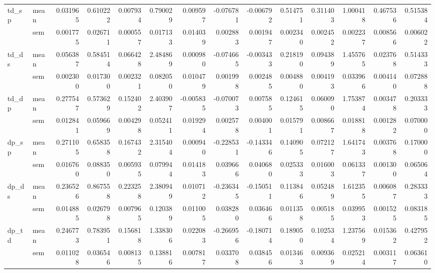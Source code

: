 \begin{tabular}{llrrrrrrrrrrrr}
\cline{1-14}
\multirow[t]{2}{*}{td_sp} & mean & 0.031965 & 0.610222 & 0.007934 & 0.790029 & 0.009597 & -0.076781 & -0.006792 & 0.514751 & 0.311403 & 1.000418 & 0.467536 & 0.515384 \\
 & sem & 0.001775 & 0.026711 & 0.000557 & 0.017133 & 0.014039 & 0.002883 & 0.001947 & 0.002340 & 0.002452 & 0.002237 & 0.008566 & 0.006022 \\
\cline{1-14}
\multirow[t]{2}{*}{td_ds} & mean & 0.056387 & 0.584514 & 0.066428 & 2.484869 & 0.000980 & -0.074665 & -0.003433 & 0.218190 & 0.094389 & 1.455765 & 0.023768 & 0.514333 \\
 & sem & 0.002300 & 0.017300 & 0.002321 & 0.082050 & 0.010479 & 0.001998 & 0.002485 & 0.004880 & 0.004193 & 0.033966 & 0.004140 & 0.072888 \\
\cline{1-14}
\multirow[t]{2}{*}{td_dp} & mean & 0.277547 & 0.573629 & 0.152402 & 2.403907 & -0.005835 & -0.070073 & 0.007585 & 0.124615 & 0.060090 & 1.753874 & 0.003478 & 0.203333 \\
 & sem & 0.012841 & 0.059669 & 0.004298 & 0.052411 & 0.019294 & 0.002578 & 0.004001 & 0.015791 & 0.008667 & 0.018818 & 0.001282 & 0.070000 \\
\cline{1-14}
\multirow[t]{2}{*}{dp_sp} & mean & 0.271105 & 0.658358 & 0.167432 & 2.315404 & 0.000940 & -0.228531 & -0.143346 & 0.140905 & 0.072127 & 1.641743 & 0.003768 & 0.170000 \\
 & sem & 0.016760 & 0.088350 & 0.005935 & 0.079944 & 0.014183 & 0.039666 & 0.040680 & 0.025333 & 0.016003 & 0.061337 & 0.001300 & 0.065064 \\
\cline{1-14}
\multirow[t]{2}{*}{dp_ds} & mean & 0.236526 & 0.867558 & 0.223258 & 2.380949 & 0.010712 & -0.236345 & -0.150511 & 0.113846 & 0.052489 & 1.612355 & 0.006087 & 0.283333 \\
 & sem & 0.014885 & 0.026798 & 0.007965 & 0.120389 & 0.011005 & 0.038280 & 0.036466 & 0.011358 & 0.005185 & 0.039953 & 0.001525 & 0.083185 \\
\cline{1-14}
\multirow[t]{2}{*}{dp_td} & mean & 0.246773 & 0.783951 & 0.156818 & 1.338306 & 0.022083 & -0.266956 & -0.180714 & 0.189050 & 0.102534 & 1.237569 & 0.015362 & 0.427952 \\
 & sem & 0.011028 & 0.036546 & 0.008135 & 0.138816 & 0.007817 & 0.033708 & 0.038456 & 0.013463 & 0.009369 & 0.025214 & 0.003117 & 0.063610 \\
\cline{1-14}
\bottomrule
\end{tabular}
